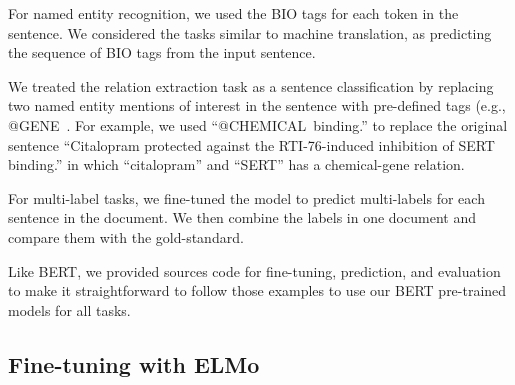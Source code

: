 \documentclass[11pt,a4paper]{article}
\begin{document}
For named entity recognition, we used the BIO tags for each token in the sentence. We considered the tasks similar to machine translation, as predicting the sequence of BIO tags from the input sentence. 

We treated the relation extraction task as a sentence classification by replacing two named entity mentions of interest in the sentence with pre-defined tags (e.g., @GENE~\cite{lee2019biobert}. For example, we used ``@CHEMICAL\ binding.'' to replace the original sentence ``Citalopram protected against the RTI-76-induced inhibition of SERT binding.'' in which ``citalopram'' and ``SERT'' has a chemical-gene relation.

For multi-label tasks, we fine-tuned the model to predict multi-labels for each sentence in the document. We then combine the labels in one document and compare them with the gold-standard.

Like BERT, we provided sources code for fine-tuning, prediction, and evaluation to make it straightforward to follow those examples to use our BERT pre-trained models for all tasks.

\subsection{Fine-tuning with ELMo}
\end{document}
